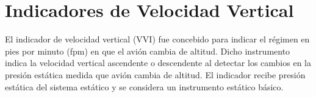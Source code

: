 \documentclass[a4paper,12pt,twoside]{article}
\begin{document}










\newpage

\section{Indicadores de Velocidad Vertical}
\label{sec:indicadores.velocidad.vertical}

El 
indicador de velocidad vertical (VVI) fue concebido para indicar el régimen en pies por minuto (fpm) en que el avión cambia de altitud. 
Dicho instrumento indica la velocidad vertical ascendente o descendente al detectar los cambios en la presión estática medida que avión cambia de altitud.
El indicador recibe presión estática del sistema estático y se considera un instrumento estático básico. 
\end{document}

